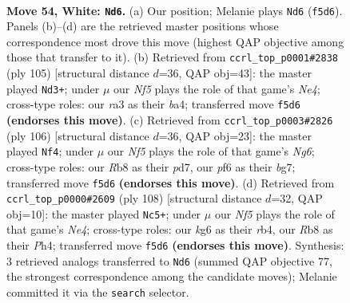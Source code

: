 \documentclass[11pt]{article}
\begin{document}
\clearpage

\begin{figure}[p]\centering
\begin{subfigure}{0.46\textwidth}\centering
\resizebox{\linewidth}{!}{%
\newchessgame
\chessboard[
  setfen={1R6/6p1/5pk1/5N1p/3P3P/r5P1/5K2/8 w - - 1 54},
  showmover=false,
  pgfstyle=straightmove, color=movearrow, markmove={f5-d6}
]}
\caption{}
\end{subfigure}\hfill
\begin{subfigure}{0.46\textwidth}\centering
\resizebox{\linewidth}{!}{%
\newchessgame
\chessboard[
  setfen={8/8/5kp1/4n2p/B4K1P/5PP1/8/8 b - - 2 53},
  showmover=false,
  pgfstyle=straightmove, color=movearrow, markmove={e5-d3}
]}
\caption{}
\end{subfigure}
\\[4pt]
\begin{subfigure}{0.46\textwidth}\centering
\resizebox{\linewidth}{!}{%
\newchessgame
\chessboard[
  setfen={8/3p1kb1/4p1N1/4P2p/8/6PK/2r4P/4R3 w - - 11 54},
  showmover=false,
  pgfstyle=straightmove, color=movearrow, markmove={g6-f4}
]}
\caption{}
\end{subfigure}\hfill
\begin{subfigure}{0.46\textwidth}\centering
\resizebox{\linewidth}{!}{%
\newchessgame
\chessboard[
  setfen={8/R7/4kpp1/4b2p/1r2N2P/6P1/5PK1/8 w - - 18 55},
  showmover=false,
  pgfstyle=straightmove, color=movearrow, markmove={e4-c5}
]}
\caption{}
\end{subfigure}
\caption{\textbf{Move 54, White: \texttt{Nd6}.} (a) Our position; Melanie plays \texttt{Nd6} (\texttt{f5d6}). Panels (b)--(d) are the retrieved master positions whose correspondence most drove this move (highest QAP objective among those that transfer to it). (b) Retrieved from \texttt{ccrl\_top\_p0001\#2838} (ply 105) [structural distance $d$=36, QAP obj=43]: the master played \texttt{Nd3+}; under $\mu$ our \emph{Nf5} plays the role of that game's \emph{Ne4}; cross-type roles: our \emph{r}a3 as their \emph{b}a4; transferred move \texttt{f5d6} \textbf{(endorses this move)}. (c) Retrieved from \texttt{ccrl\_top\_p0003\#2826} (ply 106) [structural distance $d$=36, QAP obj=23]: the master played \texttt{Nf4}; under $\mu$ our \emph{Nf5} plays the role of that game's \emph{Ng6}; cross-type roles: our \emph{R}b8 as their \emph{p}d7, our \emph{p}f6 as their \emph{b}g7; transferred move \texttt{f5d6} \textbf{(endorses this move)}. (d) Retrieved from \texttt{ccrl\_top\_p0000\#2609} (ply 108) [structural distance $d$=32, QAP obj=10]: the master played \texttt{Nc5+}; under $\mu$ our \emph{Nf5} plays the role of that game's \emph{Ne4}; cross-type roles: our \emph{k}g6 as their \emph{r}b4, our \emph{R}b8 as their \emph{P}h4; transferred move \texttt{f5d6} \textbf{(endorses this move)}. Synthesis: 3 retrieved analogs transferred to \texttt{Nd6} (summed QAP objective 77, the strongest correspondence among the candidate moves); Melanie committed it via the \texttt{search} selector.}
\label{fig:thought-m106}
\end{figure}
\end{document}
